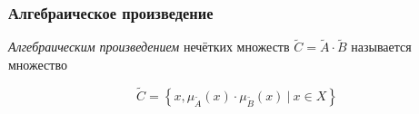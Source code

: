 \documentclass{beamer}
\begin{document}
\begin{frame}\frametitle{Алгебраическое произведение}
    \begin{definition}
        \textit{Алгебраическим произведением} нечётких множеств $\tilde C = \tilde A \cdot \tilde B$ называется множество
        
        $$ 
        \tilde C = \left\{ x, \mu_{\tilde A}(x) \cdot \mu_{\tilde B}(x)\ |\ x \in X \right\}
        $$

    \end{definition}
\end{frame}
\end{document}
